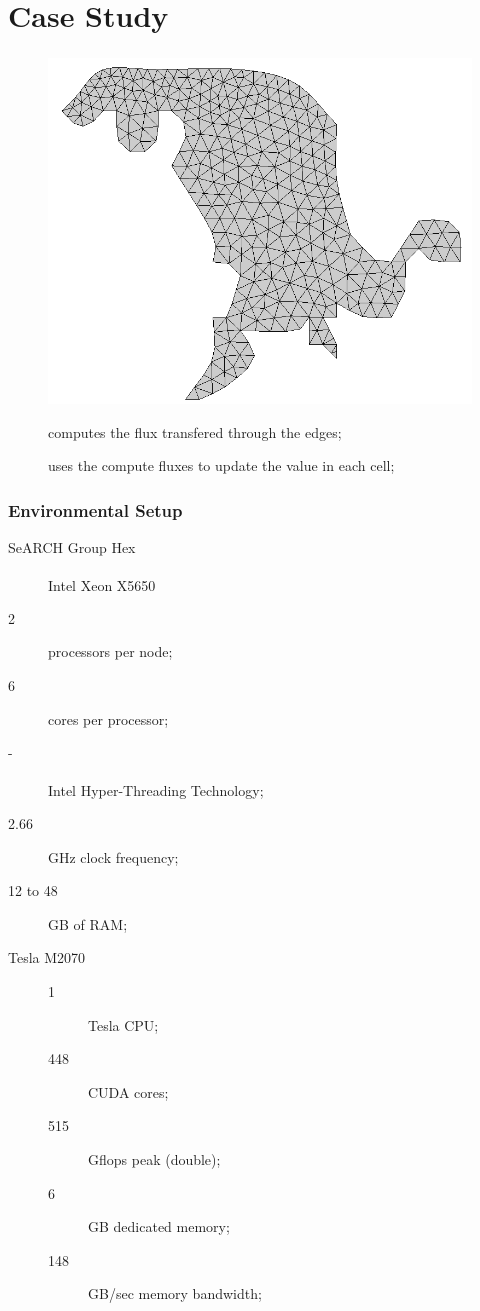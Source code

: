 \section{Case Study}

\begin{frame}[plain]
	\frametitle{\polu}
	\begin{figure}
		\centering
			\includegraphics[width=.6\textwidth]{images/foz_msh.png}
	\end{figure}
	\pause
	\begin{description}
		\item [\computeflux] computes the flux transfered through the edges;
		\item [\update] uses the compute fluxes to update the value in each cell;
	\end{description}
\end{frame}

\begin{frame}
	\frametitle{Environmental Setup}

	\begin{block}{SeARCH Group Hex}
		\begin{description}
			\item [] Intel\textsuperscript{\textregistered} Xeon\textsuperscript{\textregistered} X5650
			\item [2] processors per node;
			\item [6] cores per processor;
			\item [-] Intel\textsuperscript{\textregistered} Hyper-Threading Technology;
			\item [2.66] GHz clock frequency;
			\item [12 to 48] GB of RAM;
			\item [Tesla M2070]
			\begin{description}
				\item [1] Tesla CPU;
				\item [448] CUDA cores;
				\item [515] Gflops peak (double);
				\item [6] GB dedicated memory;
				\item [148] GB/sec memory bandwidth;
			\end{description}
		\end{description}
	\end{block}
\end{frame}

